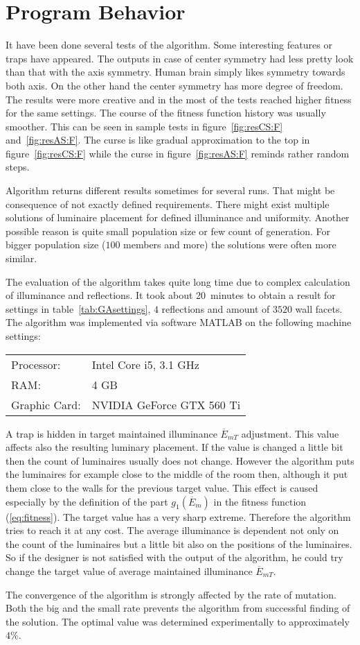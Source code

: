 \section{Program Behavior}
It have been done several tests of the algorithm. Some interesting features or traps have appeared. The outputs in case of center symmetry had less pretty look than that with the axis symmetry. Human brain simply likes symmetry towards both axis. On the other hand the center symmetry has more degree of freedom. The results were more creative and in the most of the tests reached higher fitness for the same settings. The course of the fitness function history was usually smoother. This can be seen in sample tests in figure~\ref{fig:resCS:F} and~\ref{fig:resAS:F}. The curse is like gradual approximation to the top in figure~\ref{fig:resCS:F} while the curse in figure~\ref{fig:resAS:F} reminds rather random steps.

Algorithm returns different results sometimes for several runs. That might be consequence of not exactly defined requirements. There might exist multiple solutions of luminaire placement for defined illuminance and uniformity. Another possible reason is quite small population size or few count of generation. For bigger population size ($100$ members and more) the solutions were often more similar.

The evaluation of the algorithm takes quite long time due to complex calculation of illuminance and reflections. It took about 20~minutes to obtain a result for settings in table~\ref{tab:GAsettings}, $4$ reflections and amount of $3520$ wall facets. The algorithm was implemented via software MATLAB on the following machine settings:

\begin{table}[htb]
	\renewcommand{\arraystretch}{1.3}
	\centering
  \begin{tabular}{ l l }
    Processor: & Intel Core i5, 3.1 GHz \\
    RAM: & 4 GB \\
		Graphic Card: & NVIDIA GeForce GTX 560 Ti \\
  \end{tabular}
\end{table}

A trap is hidden in target maintained illuminance $\overline{E}_{mT}$ adjustment. This value affects also the resulting luminary placement. If the value is changed a little bit then the count of luminaires usually does not change. However the algorithm puts the luminaires for example close to the middle of the room then, although it put them close to the walls for the previous target value. This effect is caused especially by the definition of the part $g_1\left(\overline{E}_{m}\right)$ in the fitness function (\ref{eq:fitness}). The target value has a very sharp extreme. Therefore the algorithm tries to reach it at any cost. The average illuminance is dependent not only on the count of the luminaires but a little bit also on the positions of the luminaires. So if the designer is not satisfied with the output of the algorithm, he could try change the target value of average maintained illuminance $\overline{E}_{mT}$.

The convergence of the algorithm is strongly affected by the rate of mutation. Both the big and the small rate prevents the algorithm from successful finding of the solution. The optimal value was determined experimentally to approximately $4 \%$.
